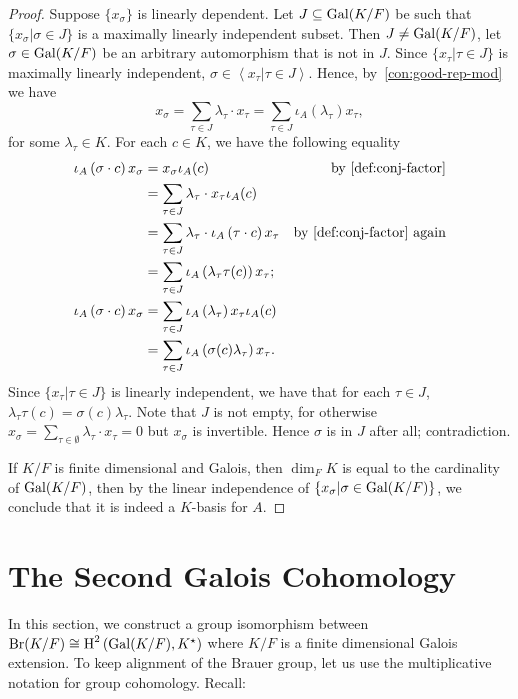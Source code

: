 \begin{proof}
  Suppose $\{x_{\sigma}\}$ is linearly dependent. Let $J \subseteq \operatorname{Gal}(K/F)$ be such that $\{x_{\sigma}|\sigma\in J\}$ is a maximally linearly independent subset.
  Then $J \ne \operatorname{Gal}(K/F)$, let $\sigma \in\operatorname{Gal}(K/F)$ be an arbitrary automorphism that is not in $J$. Since $\{x_{\tau}|\tau\in J\}$ is maximally linearly independent, $\sigma \in \left\langle x_{\tau}|\tau\in J\right\rangle$. Hence, by~\cref{con:good-rep-mod} we have
  \[
    x_\sigma = \sum_{\tau\in J}\lambda_{\tau}\cdot x_{\tau} = \sum_{\tau\in J}\iota_{A}\left(\lambda_{\tau}\right)x_{\tau},
  \]
  for some $\lambda_{\tau}\in K$.
  For each $c \in K$, we have the following equality
  \[
    \begin{aligned}
      \iota_{A}\left(\sigma \cdot c\right) x_{\sigma}
      &= x_{\sigma} \iota_{A}(c) &\text{by~\cref{def:conj-factor}}\\
      &= \sum_{\tau\in J}\lambda_{\tau}\cdot x_{\tau}\iota_{A}(c) & \\
      &= \sum_{\tau\in J}\lambda_{\tau}\cdot \iota_{A}\left(\tau\cdot c\right)x_{\tau} &\text{by~\cref{def:conj-factor} again}\\
      &=\sum_{\tau\in J}\iota_{A}\left(\lambda_{\tau}\tau(c)\right)x_{\tau};\\
      \iota_{A}\left(\sigma\cdot c\right)x_{\sigma}
      &= \sum_{\tau\in J}\iota_{A}\left(\lambda_{\tau}\right) x_{\tau}\iota_{A}(c)\\
      &= \sum_{\tau\in J}\iota_{A}\left(\sigma(c)\lambda_{\tau}\right)x_{\tau}.
    \end{aligned}
  \]
  Since $\{x_{\tau}|\tau\in J\}$ is linearly independent, we have that for each $\tau \in J$, $\lambda_{\tau}\tau(c) = \sigma(c)\lambda_{\tau}$. Note that $J$ is not empty, for otherwise $x_{\sigma}=\sum_{\tau\in\emptyset}\lambda_{\tau}\cdot x_{\tau}=0$ but $x_{\sigma}$ is invertible. Hence $\sigma$ is in $J$ after all; contradiction.

  If $K/F$ is finite dimensional and Galois, then $\dim_{F}K$ is equal to the cardinality of $\operatorname{Gal}(K/F)$, then by the linear independence of $\{x_{\sigma}|\sigma\in\operatorname{Gal}(K/F)\}$, we conclude that it is indeed a $K$-basis for $A$.
\end{proof}

\section{The Second Galois Cohomology}

In this section, we construct a group isomorphism between $\operatorname{Br}(K/F) \cong \operatorname{H}^{2}\left(\operatorname{Gal}(K/F), K^{\star}\right)$ where $K/F$ is a finite dimensional Galois extension. To keep alignment of the Brauer group, let us use the multiplicative notation for group cohomology. Recall:

